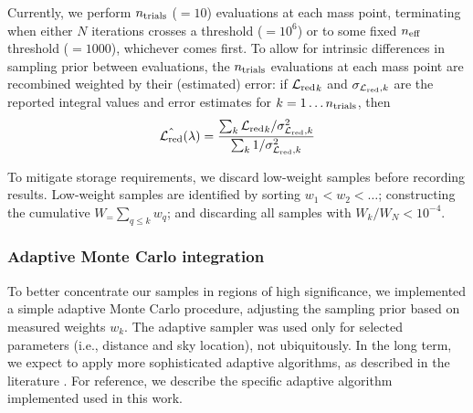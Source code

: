 Currently, we perform $n_{\rm trials}$ ($=10$) evaluations at each mass point, terminating when either $N$ iterations
crosses a threshold ($=10^6$) or to some fixed
$n_{\rm eff}$ threshold ($=1000$), whichever comes first.  
%
To allow for intrinsic differences in sampling prior between evaluations, the $n_{\rm trials}$ evaluations at each mass
point are
recombined weighted by their (estimated) error: if ${{\cal L}_{\rm red}}_k$  and $\sigma_{{{\cal L}_{\rm red}},k}$ are the reported integral
values and error estimates for $k=1\ldots n_{\rm trials}$, then
\begin{eqnarray}
\hat{{{\cal L}_{\rm red}}}(\lambda) = \frac{\sum_k {{\cal L}_{\rm red}}_k/\sigma_{{{\cal L}_{\rm red}},k}^2}{\sum_k 1/\sigma_{{{\cal L}_{\rm red}},k}^2}
\end{eqnarray}


To mitigate storage requirements, we discard  low-weight samples before recording results.  Low-weight samples are identified by sorting  $w_1<w_2<\ldots$;
constructing the cumulative $W_=\sum_{q\le k} w_q$; and discarding all samples with $W_k/W_N<10^{-4}$.  

\subsubsection{Adaptive Monte Carlo integration}

To better concentrate our samples in regions of high significance, we implemented a simple adaptive Monte Carlo procedure, adjusting
the sampling prior  based on measured weights $w_k$.   The adaptive sampler was used only for selected parameters (i.e.,
distance and sky location), not ubiquitously.   In the long term, we expect to apply more sophisticated adaptive
algorithms, as described in the literature \cite{book-mm-NumericalRecipies,peter1978new}.  For reference, we describe
the specific adaptive algorithm implemented used in this work.


